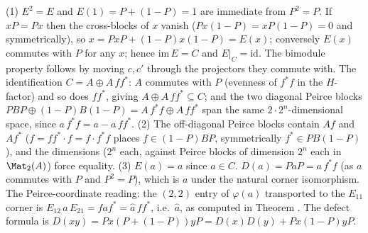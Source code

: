 (1) $E^2 = E$ and $E(1) = P + (1-P) = 1$ are immediate from $P^2 = P$. If $xP = Px$ then the cross-blocks of $x$ vanish ($Px(1-P) = xP(1-P) = 0$ and symmetrically), so $x = PxP + (1-P)x(1-P) = E(x)$; conversely $E(x)$ commutes with $P$ for any $x$; hence $\mathrm{im}\,E = C$ and $E|_C = \mathrm{id}$. The bimodule property follows by moving $c, c'$ through the projectors they commute with. The identification $C = A \oplus A\,ff^*$: $A$ commutes with $P$ (evenness of $f^*f$ in the $H$-factor) and so does $ff^*$, giving $A \oplus A\,ff^* \subseteq C$; and the two diagonal Peirce blocks $PBP \oplus (1-P)B(1-P) = A\,f^*f \oplus A\,ff^*$ span the same $2 \cdot 2^n$-dimensional space, since $a\,f^*f = a - a\,ff^*$. (2) The off-diagonal Peirce blocks contain $Af$ and $Af^*$ ($f = ff^*\cdot f = f \cdot f^*f$ places $f \in (1-P)BP$, symmetrically $f^* \in PB(1-P)$), and the dimensions ($2^n$ each, against Peirce blocks of dimension $2^n$ each in $\Mat_2(A)$) force equality. (3) $E(a) = a$ since $a \in C$. $D(a) = P a P = a\,f^*f$ (as $a$ commutes with $P$ and $P^2 = P$), which is $a$ under the natural corner isomorphism. The Peirce-coordinate reading: the $(2,2)$ entry of $\varphi(a)$ transported to the $E_{11}$ corner is $E_{12}\,a\,E_{21} = f a f^* = \hat{a}\,ff^*$, i.e.\ $\hat{a}$, as computed in Theorem . The defect formula is $D(xy) = Px(P + (1-P))yP = D(x)D(y) + Px(1-P)yP$.

